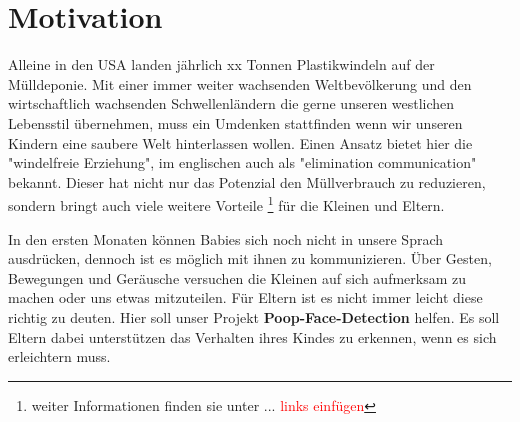 \section{Motivation}
\label{sec:Motivation}
Alleine in den USA landen jährlich xx Tonnen Plastikwindeln auf der Mülldeponie. Mit einer immer weiter wachsenden Weltbevölkerung und den wirtschaftlich wachsenden Schwellenländern die gerne unseren westlichen Lebensstil übernehmen,
muss ein Umdenken stattfinden wenn wir unseren Kindern eine saubere Welt hinterlassen wollen. Einen Ansatz bietet hier die "windelfreie Erziehung", im englischen auch als "elimination communication" bekannt. Dieser hat nicht nur das Potenzial den Müllverbrauch zu reduzieren, sondern bringt auch viele weitere Vorteile \footnote{ weiter Informationen finden sie unter ... \textcolor{red}{links einfügen}} für die Kleinen und Eltern.

In den ersten Monaten können Babies sich noch nicht in unsere Sprach ausdrücken, dennoch ist es möglich mit ihnen zu kommunizieren. Über Gesten, Bewegungen und Geräusche versuchen die Kleinen auf sich aufmerksam zu machen oder uns etwas mitzuteilen. Für Eltern ist es nicht immer leicht diese richtig zu deuten. Hier soll unser Projekt \textbf{Poop-Face-Detection} helfen. Es soll Eltern dabei unterstützen das Verhalten ihres Kindes zu erkennen, wenn es sich erleichtern muss.
